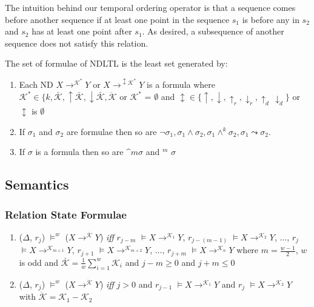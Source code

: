 The intuition behind our temporal ordering operator is that a sequence
comes before another sequence if at least one point in the sequence
$s_1$ is
before any in $s_2$ and $s_2$ has at least one point after $s_1$. As
desired, a subsequence of another sequence does not satisfy this
relation. 


The set of formulae of NDLTL is the
least set generated by:
\begin{enumerate}
\item Each ND $X \to^{\mathcal{K}^\ast} Y$ or $X \to^{\updownarrow
\mathcal{K}^\ast} Y$ is a formula where $\mathcal{K}^\ast \in \{ k,
\bar{\mathcal{K}}, \uparrow\bar{\mathcal{K}}, \downarrow\bar{\mathcal{K}}, 
\ddot{\mathcal{K}}$ or $\mathcal{K}^\ast$ = $\emptyset$
  and $\updownarrow  \in \{ \uparrow,
\downarrow, \uparrow_r,\downarrow_r,\uparrow_d\,\downarrow_d \}$ or
$\updownarrow$ is $\emptyset$
\item If $\sigma_1$ and $\sigma_2$ are formulae then so are $\neg \sigma_1,
\sigma_1 \wedge \sigma_2, \sigma_1 \wedge^k \sigma_2,   \sigma_1 \leadsto
\sigma_2$. 
\item If $\sigma$ is a formula then so are $\bm^m \sigma$ and  \diam$^m$ 
$\sigma$
\end{enumerate}

\subsection{Semantics}


\subsubsection{Relation State Formulae}
\begin{enumerate}


\item\label{item:ma} ($\Delta$, $r_j$) $\models^w$ ($X
\to^{\bar{\mathcal{K}}} Y$) { \em iff } $r_{j-m}$
$\models X \to^{\mathcal{K}_1} Y$,  $r_{j-(m-1)}$
$\models X \to^{\mathcal{K}_2} Y$, $\ldots$,  $r_{j}$
$\models X \to^{\mathcal{K}_{m+1}} Y$,  $r_{j+1}$ 
$\models X \to^{\mathcal{K}_{m+2}} Y$, $\ldots$,  $r_{j+m}$
$\models X \to^{\mathcal{K}_n} Y$ where $m = \frac{w-1}{2}$, $w$ is odd
and $\bar{\mathcal{K}} = \frac{1}{w} \sum_{i = 1}^{w} \mathcal{K}_i$
and $j - m \ge 0$ and $j + m \le 0$

\item\label{item:diff} ($\Delta$, $r_j$) $\models^w$ ($X 
{\to}^{\ddot{\mathcal{K}}}  Y$) { \em iff } $j > 0$ and $r_{j-1}$
$\models X \to^{\mathcal{K}_1} Y$ and  $r_{j}$
$\models X \to^{\mathcal{K}_2} Y$ with $\ddot{\mathcal{K}} = {\mathcal{K}_1} -{\mathcal{K}_2}$


\end{enumerate}

